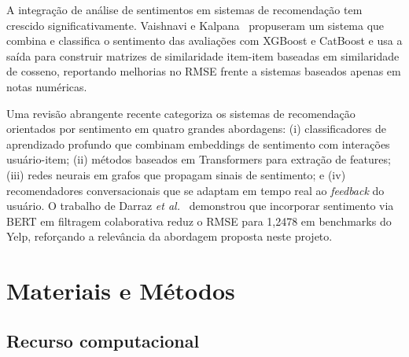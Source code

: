\documentclass{IEEEtran}
\begin{document}
A integração de análise de sentimentos em sistemas de recomendação tem crescido significativamente. Vaishnavi e Kalpana~\cite{vaishnavi2023sentiment} propuseram um sistema que combina e classifica o sentimento das avaliações com XGBoost e CatBoost e usa a saída para construir matrizes de similaridade item-item baseadas em similaridade de cosseno, reportando melhorias no RMSE frente a sistemas baseados apenas em notas numéricas.


Uma revisão abrangente recente \cite{ahmed2025sentimentaware} categoriza os sistemas de recomendação orientados por sentimento em quatro grandes abordagens: (i) classificadores de aprendizado profundo que combinam embeddings de sentimento com interações usuário-item; (ii) métodos baseados em Transformers para extração de features; (iii) redes neurais em grafos que propagam sinais de sentimento; e (iv) recomendadores conversacionais que se adaptam em tempo real ao \textit{feedback} do usuário. O trabalho de Darraz \textit{et al.}~\cite{sharma2025enhancing} demonstrou que incorporar sentimento via BERT em filtragem colaborativa reduz o RMSE para 1,2478 em benchmarks do Yelp, reforçando a relevância da abordagem proposta neste projeto.


\section{Materiais e Métodos}
\label{sec:methodology}

\subsection{Recurso computacional}
\label{subsec:resource}
\end{document}
